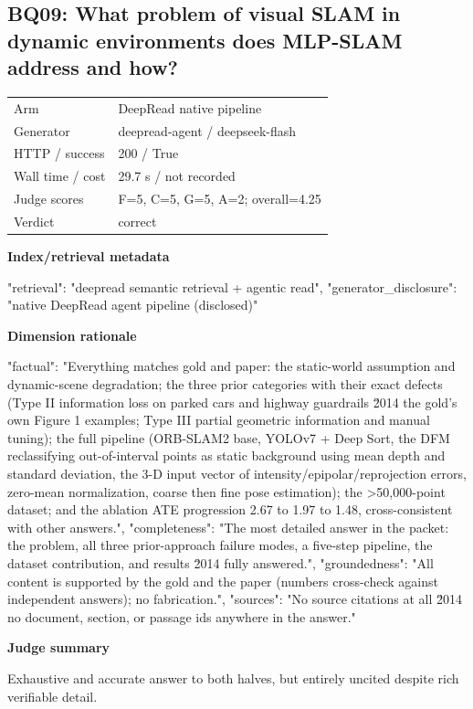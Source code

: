 \documentclass[10pt]{article}
\begin{document}
\subsection{BQ09: What problem of visual SLAM in dynamic environments does MLP-SLAM address and how?}
\begin{tabular}{@{}ll@{}}
Arm & DeepRead native pipeline\\
Generator & deepread-agent / deepseek-flash\\
HTTP / success & 200 / True\\
Wall time / cost & 29.7 s / not recorded\\
Judge scores & F=5, C=5, G=5, A=2; overall=4.25\\
Verdict & correct\\
\end{tabular}

\textbf{Index/retrieval metadata}
\begin{EvidenceText}
{
  "retrieval": "deepread semantic retrieval + agentic read",
  "generator_disclosure": "native DeepRead agent pipeline (disclosed)"
}
\end{EvidenceText}

\textbf{Dimension rationale}
\begin{EvidenceText}
{
  "factual": "Everything matches gold and paper: the static-world assumption and dynamic-scene degradation; the three prior categories with their exact defects (Type II information loss on parked cars and highway guardrails \u2014 the gold's own Figure 1 examples; Type III partial geometric information and manual tuning); the full pipeline (ORB-SLAM2 base, YOLOv7 + Deep Sort, the DFM reclassifying out-of-interval points as static background using mean depth and standard deviation, the 3-D input vector of intensity/epipolar/reprojection errors, zero-mean normalization, coarse then fine pose estimation); the >50,000-point dataset; and the ablation ATE progression 2.67 to 1.97 to 1.48, cross-consistent with other answers.",
  "completeness": "The most detailed answer in the packet: the problem, all three prior-approach failure modes, a five-step pipeline, the dataset contribution, and results \u2014 fully answered.",
  "groundedness": "All content is supported by the gold and the paper (numbers cross-check against independent answers); no fabrication.",
  "sources": "No source citations at all \u2014 no document, section, or passage ids anywhere in the answer."
}
\end{EvidenceText}

\textbf{Judge summary}
\begin{EvidenceText}
Exhaustive and accurate answer to both halves, but entirely uncited despite rich verifiable detail.
\end{EvidenceText}
\end{document}
